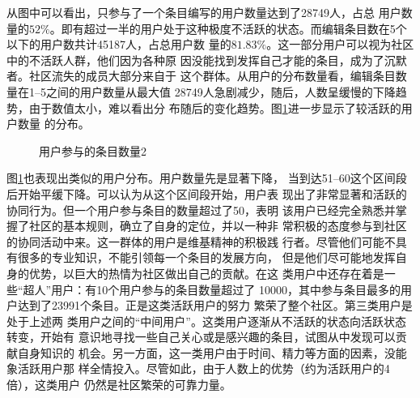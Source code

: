 从图中可以看出，只参与了一个条目编写的用户数量达到了28749人，占总
用户数量的$52\%$。即有超过一半的用户处于这种极度不活跃的状态。而编辑条目数在5个以下的用户数共计45187人，占总用户数
量的$81.83\%$。这一部分用户可以视为社区中的不活跃人群，他们因为各种原
因没能找到发挥自己才能的条目，成为了沉默者。社区流失的成员大部分来自于
这个群体。从用户的分布数量看，编辑条目数量在1--5之间的用户数量从最大值
28749人急剧减少，随后，人数呈缓慢的下降趋势，由于数值太小，难以看出分
布随后的变化趋势。图\ref{fig:user-entry-2}进一步显示了较活跃的用户数量
的分布。
\begin{figure}[htb]
  \centering
  \caption{\small{用户参与的条目数量2}}
  \label{fig:user-entry-2}
\end{figure}

图\ref{fig:user-entry-2}也表现出类似的用户分布。用户数量先是显著下降，
当到达51--60这个区间段后开始平缓下降。可以认为从这个区间段开始，用户表
现出了非常显著和活跃的协同行为。但一个用户参与条目的数量超过了50，表明
该用户已经完全熟悉并掌握了社区的基本规则，确立了自身的定位，并以一种非
常积极的态度参与到社区的协同活动中来。这一群体的用户是维基精神的积极践
行者。尽管他们可能不具有很多的专业知识，不能引领每一个条目的发展方向，
但是他们尽可能地发挥自身的优势，以巨大的热情为社区做出自己的贡献。在这
类用户中还存在着是一些“超人”用户：有10个用户参与的条目数量超过了
10000，其中参与条目最多的用户达到了23991个条目。正是这类活跃用户的努力
繁荣了整个社区。第三类用户是处于上述两
类用户之间的“中间用户”。这类用户逐渐从不活跃的状态向活跃状态转变，开始有
意识地寻找一些自己关心或是感兴趣的条目，试图从中发现可以贡献自身知识的
机会。另一方面，这一类用户由于时间、精力等方面的因素，没能象活跃用户那
样全情投入。尽管如此，由于人数上的优势（约为活跃用户的4倍），这类用户
仍然是社区繁荣的可靠力量。


